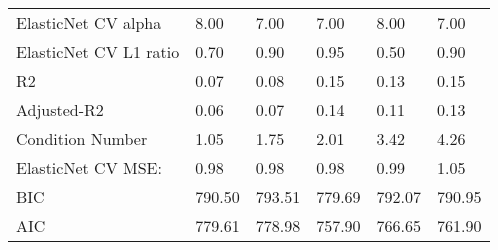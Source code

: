 \begin{table}
\begin{center}
\begin{tabular}{llllll}
ElasticNet CV alpha                            & 8.00    & 7.00    & 7.00    & 8.00    & 7.00      \\
ElasticNet CV  L1 ratio                        & 0.70    & 0.90    & 0.95    & 0.50    & 0.90      \\
R2                                             & 0.07    & 0.08    & 0.15    & 0.13    & 0.15      \\
Adjusted-R2                                    & 0.06    & 0.07    & 0.14    & 0.11    & 0.13      \\
Condition Number                               & 1.05    & 1.75    & 2.01    & 3.42    & 4.26      \\
ElasticNet CV MSE:                             & 0.98    & 0.98    & 0.98    & 0.99    & 1.05      \\
BIC                                            & 790.50  & 793.51  & 779.69  & 792.07  & 790.95    \\
AIC                                            & 779.61  & 778.98  & 757.90  & 766.65  & 761.90    \\
\hline
\end{tabular}
\end{center}
\end{table}